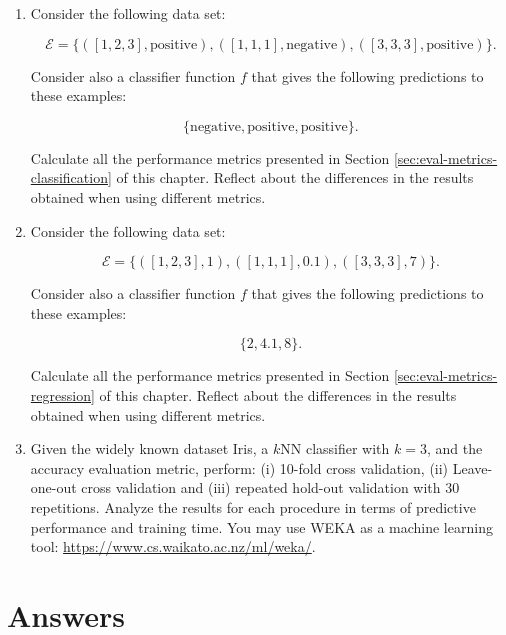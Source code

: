 \begin{enumerate}
    \item Consider the following data set:

    \[ \mathcal{E} = \{([1,2,3], \text{positive}), ([1,1,1], \text{negative}), ([3,3,3], \text{positive})\}.\] 

    Consider also a classifier function $f$ that gives the following predictions to these examples:

    \[\{\text{negative}, \text{positive}, \text{positive}\}.\]

    Calculate all the performance metrics presented in Section \ref{sec:eval-metrics-classification} of this chapter. Reflect about the differences in the results obtained when using different metrics.

    \item Consider the following data set:

    \[ \mathcal{E} = \{([1,2,3], 1), ([1,1,1], 0.1), ([3,3,3], 7)\}.\] 

     Consider also a classifier function $f$ that gives the following predictions to these examples:

    \[\{2, 4.1, 8\}.\]

    Calculate all the performance metrics presented in Section \ref{sec:eval-metrics-regression} of this chapter. Reflect about the differences in the results obtained when using different metrics.

    \item Given the widely known dataset Iris, a $k$NN classifier with $k = 3$, and the accuracy evaluation metric, perform: (i) 10-fold cross validation, (ii) Leave-one-out cross validation and (iii) repeated hold-out validation with 30 repetitions. Analyze the results for each procedure in terms of predictive performance and training time. You may use WEKA as a machine learning tool: \url{https://www.cs.waikato.ac.nz/ml/weka/}.

\end{enumerate}

\section{Answers}


